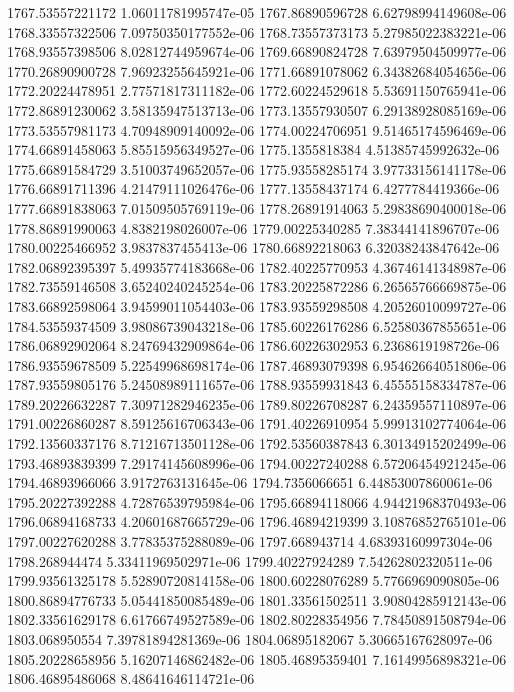 {1767.53557221172 1.06011781995747e-05
1767.86890596728 6.62798994149608e-06
1768.33557322506 7.09750350177552e-06
1768.73557373173 5.27985022383221e-06
1768.93557398506 8.02812744959674e-06
1769.66890824728 7.63979504509977e-06
1770.26890900728 7.96923255645921e-06
1771.66891078062 6.34382684054656e-06
1772.20224478951 2.77571817311182e-06
1772.60224529618 5.53691150765941e-06
1772.86891230062 3.58135947513713e-06
1773.13557930507 6.29138928085169e-06
1773.53557981173 4.70948909140092e-06
1774.00224706951 9.51465174596469e-06
1774.66891458063 5.85515956349527e-06
1775.1355818384 4.51385745992632e-06
1775.66891584729 3.51003749652057e-06
1775.93558285174 3.97733156141178e-06
1776.66891711396 4.21479111026476e-06
1777.13558437174 6.4277784419366e-06
1777.66891838063 7.01509505769119e-06
1778.26891914063 5.29838690400018e-06
1778.86891990063 4.8382198026007e-06
1779.00225340285 7.38344141896707e-06
1780.00225466952 3.9837837455413e-06
1780.66892218063 6.32038243847642e-06
1782.06892395397 5.49935774183668e-06
1782.40225770953 4.36746141348987e-06
1782.73559146508 3.65240240245254e-06
1783.20225872286 6.26565766669875e-06
1783.66892598064 3.94599011054403e-06
1783.93559298508 4.20526010099727e-06
1784.53559374509 3.98086739043218e-06
1785.60226176286 6.52580367855651e-06
1786.06892902064 8.24769432909864e-06
1786.60226302953 6.2368619198726e-06
1786.93559678509 5.22549968698174e-06
1787.46893079398 6.95462664051806e-06
1787.93559805176 5.24508989111657e-06
1788.93559931843 6.45555158334787e-06
1789.20226632287 7.30971282946235e-06
1789.80226708287 6.24359557110897e-06
1791.00226860287 8.59125616706343e-06
1791.40226910954 5.99913102774064e-06
1792.13560337176 8.71216713501128e-06
1792.53560387843 6.30134915202499e-06
1793.46893839399 7.29174145608996e-06
1794.00227240288 6.57206454921245e-06
1794.46893966066 3.9172763131645e-06
1794.7356066651 6.44853007860061e-06
1795.20227392288 4.72876539795984e-06
1795.66894118066 4.94421968370493e-06
1796.06894168733 4.20601687665729e-06
1796.46894219399 3.10876852765101e-06
1797.00227620288 3.77835375288089e-06
1797.668943714 4.68393160997304e-06
1798.268944474 5.33411969502971e-06
1799.40227924289 7.54262802320511e-06
1799.93561325178 5.52890720814158e-06
1800.60228076289 5.7766969090805e-06
1800.86894776733 5.05441850085489e-06
1801.33561502511 3.90804285912143e-06
1802.33561629178 6.61766749527589e-06
1802.80228354956 7.78450891508794e-06
1803.068950554 7.39781894281369e-06
1804.06895182067 5.30665167628097e-06
1805.20228658956 5.16207146862482e-06
1805.46895359401 7.16149956898321e-06
1806.46895486068 8.48641646114721e-06
}

